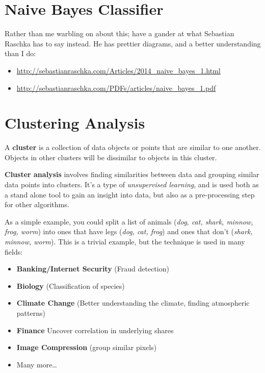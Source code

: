 \section{Naive Bayes Classifier}

Rather than me warbling on about this; have a gander at what Sebastian Raschka
has to say instead. He has prettier diagrams, and a better understanding than I
do:

\begin{itemize}
  \item \url{http://sebastianraschka.com/Articles/2014_naive_bayes_1.html}

  \item \url{http://sebastianraschka.com/PDFs/articles/naive_bayes_1.pdf}
\end{itemize}

\section{Clustering Analysis}

A \textbf{cluster} is a collection of data objects or points that are similar to
one another. Objects in other clusters will be dissimilar to objects in this
cluster.


\textbf{Cluster analysis} involves finding similarities between data and
grouping similar data points into clusters. It's a type of \textit{unsupervised
learning}, and is used both as a stand alone tool to gain an insight into data,
but also as a pre-processing step for other algorithms.

As a simple example, you could split a list of animals (\textit{dog, cat, shark,
minnow, frog, worm}) into ones that have legs (\textit{dog, cat, frog}) and ones
that don't (\textit{shark, minnow, worm}). This is a trivial example, but the
technique is used in many fields:

\begin{mymulticols}
  \begin{itemize}
    \item \textbf{Banking/Internet Security} (Fraud detection)
    \item \textbf{Biology} (Classification of species)
    \item \textbf{Climate Change} (Better understanding the climate, finding
      atmospheric patterns)
    \item \textbf{Finance} Uncover correlation in underlying shares
    \item \textbf{Image Compression} (group similar pixels)
    \item Many more\dots
  \end{itemize}
\end{mymulticols}

